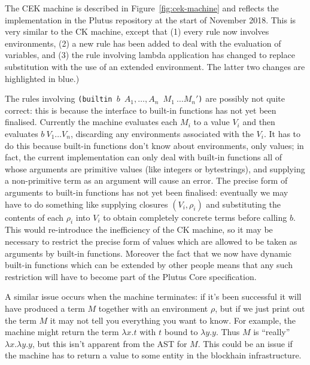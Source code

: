 \documentclass[a4paper]{article}
\begin{document}
The CEK machine is described in Figure~\ref{fig:cek-machine} and
reflects the implementation in the Plutus repository at the start of
November 2018.  This is very similar to the CK machine, except that
(1) every rule now involves environments, (2) a new rule has been
added to deal with the evaluation of variables, and (3) the rule
involving lambda application has changed to replace substitution with
the use of an extended environment. The latter two changes are
highlighted in blue.)




The rules involving \texttt{(builtin $b$\ $A_1, \ldots, A_n$
  $M_1\ \ldots M_n'$)} are possibly not quite correct: this is because the
interface to built-in functions has not yet been finalised.  Currently
the machine evaluates each $M_i$ to a value $V_i$ and then evaluates
$b\ V_1 \ldots V_n$, discarding any environments associated with the
$V_i$.  It has to do this because built-in functions don't know about
environments, only values; in fact, the current implementation can
only deal with built-in functions all of whose arguments are primitive
values (like integers or bytestrings), and supplying a non-primitive
term as an argument will cause an error.  The precise form of
arguments to built-in functions has not yet been finalised: eventually
we may have to do something like supplying closures $(V_i, \rho_i)$
and substituting the contents of each $\rho_i$ into $V_i$ to obtain
completely concrete terms before calling $b$.  This would re-introduce
the inefficiency of the CK machine, so it may be necessary to restrict
the precise form of values which are allowed to be taken as arguments
by built-in functions. Moreover the fact that we now have dynamic
built-in functions which can be extended by other people means that
any such restriction will have to become part of the Plutus Core
specification.

A similar issue occurs when the machine terminates: if it's been
successful it will have produced a term $M$ together with an
environment $\rho$, but if we just print out the term $M$ it may not
tell you everything you want to know.  For example, the machine might
return the term $\lambda x.t$ with $t$ bound to $\lambda y.y$.  Thus
$M$ is ``really'' $\lambda x.\lambda y.y$, but this isn't apparent
from the AST for $M$.  This could be an issue if the machine has to
return a value to some entity in the blockhain infrastructure.  


\newpage

\end{document}
